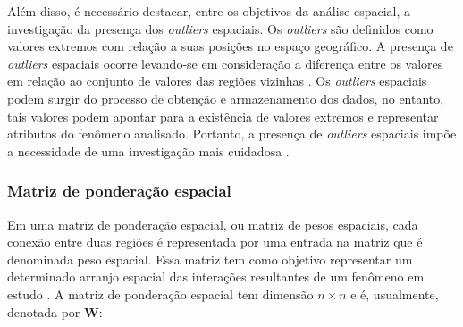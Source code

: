 \documentclass[
	12pt,				%
	openright,			%
	oneside,			%
	a4paper,			%
	chapter=TITLE,		%
	section=TITLE,		%
	english,			%
	french,				%
	spanish,			%
	brazil				%
	]{abntex2}
\begin{document}


Além disso, é necessário destacar, entre os objetivos da análise espacial, a investigação da presença dos \textit{outliers} espaciais. Os \textit{outliers} são definidos como valores extremos com relação a suas posições no espaço geográfico. A presença de \textit{outliers} espaciais ocorre levando-se em consideração a diferença entre os valores em relação ao conjunto de valores das regiões vizinhas \cite{haining03}. Os \textit{outliers} espaciais podem surgir do processo de obtenção e armazenamento dos dados, no entanto, tais valores podem apontar para a existência de valores extremos e representar atributos do fenômeno analisado. Portanto, a presença de \textit{outliers} espaciais impõe a necessidade de uma investigação mais cuidadosa \cite{almeida12}.

\subsubsection{Matriz de ponderação espacial}

Em uma matriz de ponderação espacial, ou matriz de pesos espaciais, cada conexão entre duas regiões é representada por uma entrada na matriz que é denominada peso espacial. Essa matriz tem como objetivo representar um determinado arranjo espacial das interações resultantes de um fenômeno em estudo \cite{almeida12}. A matriz de ponderação espacial tem dimensão $n \times n$ e é, usualmente, denotada por $\boldsymbol{W}$: 
\end{document}
